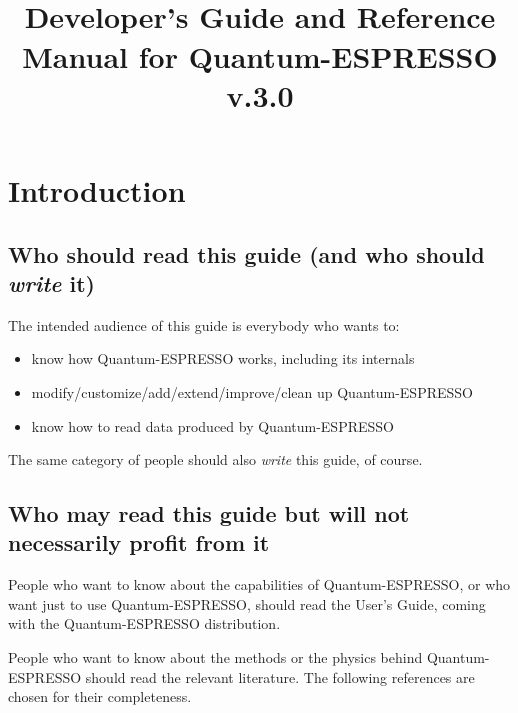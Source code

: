 \documentclass[12pt,a4paper]{article}
\def\version{3.0}
\begin{document}
 

\author{}
\date{}
\title{
  \hfill%
  \vspace{1.5cm}
  \\
  \huge Developer's Guide and Reference Manual for Quantum-ESPRESSO
       v.\version
}
\maketitle

\tableofcontents

\clearpage

\section{Introduction}

\subsection{Who should read this guide (and who should {\em write} it)}

The intended audience of this guide is everybody who wants to:
\begin{itemize}
  \item know how Quantum-ESPRESSO works, including its internals
  \item modify/customize/add/extend/improve/clean up Quantum-ESPRESSO
  \item know how to read data produced by Quantum-ESPRESSO
\end{itemize}
The same category of people should also {\em write} this guide, of course.

\subsection{Who may read this guide but will not necessarily
profit from it}

People who want to know about the capabilities of Quantum-ESPRESSO,
or who want just to use Quantum-ESPRESSO, should read the User's Guide, 
coming with the Quantum-ESPRESSO distribution.

People who want to know about the methods or the physics
behind Quantum-ESPRESSO should read the relevant literature. The
following references are chosen for their completeness.
\end{document}
